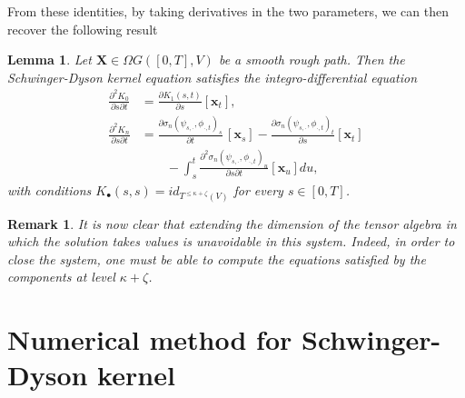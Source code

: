 \documentclass{article}%
\newtheorem{lemma}[theorem]{Lemma}
\newtheorem{remark}[theorem]{Remark}
\begin{document}
From these identities, by taking derivatives in the two parameters, we can then recover the following result
\begin{lemma}
  Let $\mathbf{X} \in \Omega G([0,T], V)$ be a smooth rough path. Then the Schwinger-Dyson kernel equation satisfies the integro-differential equation
  \begin{align*}
      \frac{\partial^2 K_{0}}{\partial s \partial t} &=  \frac{\partial K_{1}(s,t) }{\partial s} [\boldsymbol{x}_t], \\
      \frac{\partial^2 K_{n}}{\partial s \partial t} &= \frac{\partial \sigma_n( \psi_{s, \cdot}, \phi_{\cdot, t})_s}{\partial t}\,[\boldsymbol{x}_s] - \frac{\partial \sigma_n( \psi_{s, \cdot}, \phi_{\cdot, t})_t}{\partial s} [\boldsymbol{x}_t] \\
      &\qquad - \int_s^t \frac{\partial^2 \sigma_n( \psi_{s, \cdot}, \phi_{\cdot, t})_u}{\partial s \partial t} [\boldsymbol{x}_u] du,
  \end{align*}
  with conditions $K_{\bullet}(s,s) = id_{T^{\leq \kappa + \zeta}(V)}$ for every $s \in [0, T]$.
\end{lemma}

\begin{remark}
It is now clear that extending the dimension of the tensor algebra in which the solution takes values is unavoidable in this system. Indeed, in order to close the system, one must be able to compute the equations satisfied by the components at level $\kappa + \zeta$.
\end{remark}

\section{Numerical method for Schwinger-Dyson kernel}\label{numerical_method_section}
\end{document}
